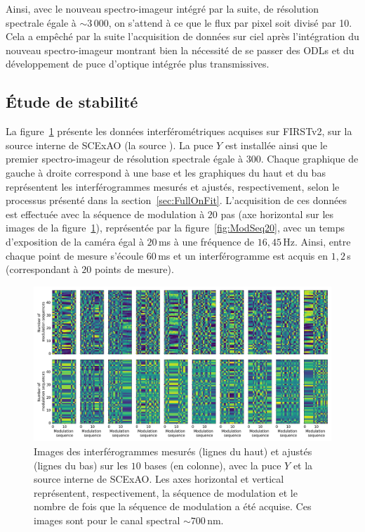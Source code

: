 Ainsi, avec le nouveau spectro-imageur intégré par la suite, de résolution spectrale égale à $\sim 3\,000$, on s'attend à ce que le flux par pixel soit divisé par 10. Cela a empêché par la suite l'acquisition de données sur ciel après l'intégration du nouveau spectro-imageur montrant bien la nécessité de se passer des \ac{ODL}s et du développement de puce d'optique intégrée plus transmissives.


\subsection{Étude de stabilité}
\label{sec:V2StabilitySubaru}

La figure~\ref{fig:FullOnDataSCExAO} présente les données interférométriques acquises sur \ac{FIRSTv2}, sur la source interne de \ac{SCExAO} (la source \sk). La puce $Y$ est installée ainsi que le premier spectro-imageur de résolution spectrale égale à $300$. Chaque graphique de gauche à droite correspond à une base et les graphiques du haut et du bas représentent les interférogrammes mesurés et ajustés, respectivement, selon le processus présenté dans la section~\ref{sec:FullOnFit}. L'acquisition de ces données est effectuée avec la séquence de modulation à $20$ pas (axe horizontal sur les images de la figure~\ref{fig:FullOnDataSCExAO}), représentée par la figure~\ref{fig:ModSeq20}, avec un temps d'exposition de la caméra égal à $20 \,$ms à une fréquence de $16,45 \,$Hz. Ainsi, entre chaque point de mesure s'écoule $60 \,$ms et un interférogramme est acquis en $1,2 \,$s (correspondant à $20$ points de mesure).

\begin{figure}[ht!]
    \centering
    \includegraphics[width=\figwidth]{Figure_Chap5/20220225_SuperK_FringeFitting_TemporalModulation_Pola1_Base_LaTex.png}
    \caption[Images des interférogrammes mesurés et ajustés, avec la puce $Y$ sur la source interne de SCExAO.]{Images des interférogrammes mesurés (lignes du haut) et ajustés (lignes du bas) sur les $10$ bases (en colonne), avec la puce $Y$ et la source interne de SCExAO. Les axes horizontal et vertical représentent, respectivement, la séquence de modulation et le nombre de fois que la séquence de modulation a été acquise. Ces images sont pour le canal spectral $\sim 700 \,$nm.}
    \label{fig:FullOnDataSCExAO}
\end{figure}

